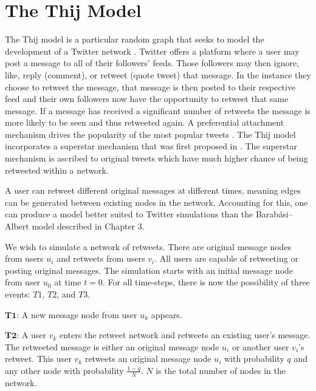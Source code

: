 \chapter{The Thij Model}
\label{section:Thij model}
The Thij model is a particular random graph that seeks to model the development of a Twitter network 
 \cite{thij}. Twitter offers a platform where a user may post a message
to all of their followers' feeds. Those followers may then ignore, like, reply (comment), or retweet (quote tweet) that message. In the
instance they choose to retweet the message, that message is then posted to their respective feed and their own
followers now have the opportunity to retweet that same message. If a
message has received a significant number of retweets the message is more likely to be seen and thus
retweeted again. A preferential attachment mechanism drives the popularity of the most popular tweets \cite{Aparicio}. The 
Thij model incorporates a superstar mechanism that was first proposed in \cite{Bhamidi_2015}. The superstar mechanism is 
ascribed to original tweets which have much higher chance of being retweeted within a network.

A user can retweet different original messages at different times, meaning edges can be generated between
existing nodes in the network. Accounting for this, one can produce
a model better suited to Twitter simulations than the Barabási–Albert model described in Chapter 3.

We wish to simulate a network of retweets. There are original message nodes from users $u_i$ and retweets from users $v_i$. All users
are capable of retweeting or posting original messages. 
 The simulation starts with an initial message node from user $u_{0}$ at time $t=0$. For all time-steps, there is now the possibility of three events: $T1$,
$T2$, and $T3$. 

\vspace{3mm}

\noindent $\pmb{T1}$: A new message node from user $u_k$ appears.

\vspace{3mm}

\noindent $\pmb{T2}$: A user $v_k$ enters the retweet network and retweets an existing user's message. The retweeted message is either an original message node $u_i$
or another user $v_i$'s retweet. This user $v_k$ retweets an original message node $u_i$ with 
probability $q$ and any other node with probability $\frac{1-q}{N}$. $N$ is the total number of nodes in the network.

